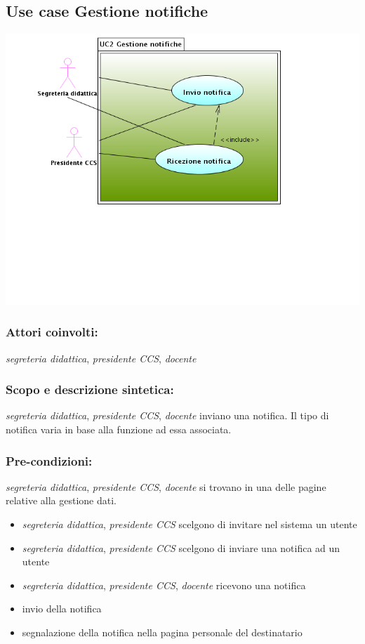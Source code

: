 \documentclass[11pt,a4paper]{article}
\begin{document}
\subsection{Use case Gestione notifiche}
\begin{center} 
 \includegraphics[scale=0.5]{images/UseCaseGestioneNotifiche.png} 
\end{center}
\subsubsection*{Attori coinvolti:}
\textit{segreteria didattica}, \textit{presidente CCS}, \textit{docente}
\subsubsection*{Scopo e descrizione sintetica:}
\textit{segreteria didattica}, \textit{presidente CCS}, \textit{docente} inviano una notifica. Il tipo di notifica varia in base alla funzione ad essa associata.
\subsubsection*{Pre-condizioni:}
\textit{segreteria didattica}, \textit{presidente CCS}, \textit{docente} si trovano in una delle pagine relative alla gestione dati.
\begin{itemize}
 \item \textit{segreteria didattica}, \textit{presidente CCS} scelgono di invitare nel sistema un utente
\item \textit{segreteria didattica}, \textit{presidente CCS} scelgono di inviare una notifica ad un utente
\item \textit{segreteria didattica}, \textit{presidente CCS}, \textit{docente} ricevono una notifica
\end{itemize}
\begin{itemize}
 \item invio della notifica
 \item segnalazione della notifica nella pagina personale del destinatario
\end{itemize}
\end{document}
